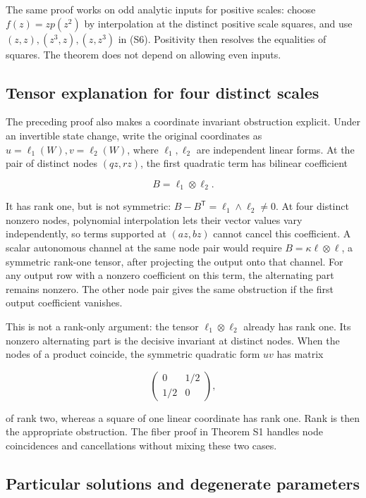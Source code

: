 The same proof works on odd analytic inputs for positive scales: choose
\(f(z)=z p(z^2)\) by interpolation at the distinct positive scale
squares, and use \((z,z),(z^3,z),(z,z^3)\) in (S6). Positivity then
resolves the equalities of squares. The theorem does not depend on
allowing even inputs.

\hypertarget{v11-coupled_structure_full-tensor-explanation-for-four-distinct-scales}{%
\subsection{Tensor explanation for four distinct
scales}\label{v11-coupled_structure_full-tensor-explanation-for-four-distinct-scales}}

The preceding proof also makes a coordinate invariant obstruction
explicit. Under an invertible state change, write the original
coordinates as \(u=\ell_1(W),v=\ell_2(W)\), where \(\ell_1,\ell_2\) are
independent linear forms. At the pair of distinct nodes \((qz,rz)\), the
first quadratic term has bilinear coefficient

\[
B=\ell_1\otimes\ell_2.
\]

It has rank one, but is not symmetric:
\(B-B^{\mathsf T}=\ell_1\wedge\ell_2\ne0\). At four distinct nonzero
nodes, polynomial interpolation lets their vector values vary
independently, so terms supported at \((az,bz)\) cannot cancel this
coefficient. A scalar autonomous channel at the same node pair would
require \(B=\kappa\ell\otimes\ell\), a symmetric rank-one tensor, after
projecting the output onto that channel. For any output row with a
nonzero coefficient on this term, the alternating part remains nonzero.
The other node pair gives the same obstruction if the first output
coefficient vanishes.

This is not a rank-only argument: the tensor \(\ell_1\otimes\ell_2\)
already has rank one. Its nonzero alternating part is the decisive
invariant at distinct nodes. When the nodes of a product coincide, the
symmetric quadratic form \(uv\) has matrix

\[
\begin{pmatrix}0&1/2\\1/2&0\end{pmatrix},
\]

of rank two, whereas a square of one linear coordinate has rank one.
Rank is then the appropriate obstruction. The fiber proof in Theorem S1
handles node coincidences and cancellations without mixing these two
cases.

\hypertarget{v11-coupled_structure_full-particular-solutions-and-degenerate-parameters}{%
\subsection{Particular solutions and degenerate
parameters}\label{v11-coupled_structure_full-particular-solutions-and-degenerate-parameters}}

